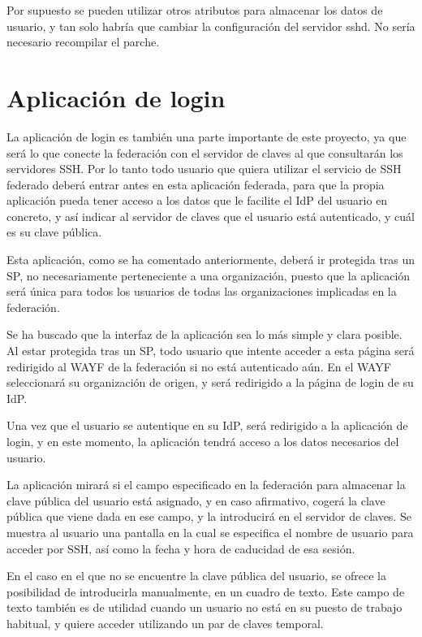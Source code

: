     Por supuesto se pueden utilizar otros atributos para almacenar los
    datos de usuario, y tan solo habría que cambiar la configuración del
    servidor sshd. No sería necesario recompilar el parche.

    \section{Aplicación de login}
    \label{login}
    

    La aplicación de login es también una parte importante de este
    proyecto, ya que será lo que conecte la federación con el servidor de
    claves al que consultarán los servidores SSH. Por lo tanto todo usuario
    que quiera utilizar el servicio de SSH federado deberá entrar antes en
    esta aplicación federada, para que la propia aplicación pueda tener
    acceso a los datos que le facilite el IdP del usuario en concreto, y
    así indicar al servidor de claves que el usuario está autenticado, y
    cuál es su clave pública.

    Esta aplicación, como se ha comentado anteriormente, deberá ir
    protegida tras un SP, no necesariamente perteneciente a una
    organización, puesto que la aplicación será única para todos los
    usuarios de todas las organizaciones implicadas en la federación.

    Se ha buscado que la interfaz de la aplicación sea lo más simple y
    clara posible. Al estar protegida tras un SP, todo usuario que
    intente acceder a esta página será redirigido al WAYF de la federación
    si no está autenticado aún. En el WAYF seleccionará su organización de
    origen, y será redirigido a la página de login de su IdP.

    Una vez que el usuario se autentique en su IdP, será redirigido a la
    aplicación de login, y en este momento, la aplicación tendrá acceso a
    los datos necesarios del usuario.

    La aplicación mirará si el campo especificado en la federación para
    almacenar la clave pública del usuario está asignado, y en caso
    afirmativo, cogerá la clave pública que viene dada en ese campo, y la
    introducirá en el servidor de claves. Se muestra al usuario una
    pantalla en la cual se especifica el nombre de usuario para acceder por
    SSH, así como la fecha y hora de caducidad de esa sesión.

    En el caso en el que no se encuentre la clave pública del usuario, se
    ofrece la posibilidad de introducirla manualmente, en un cuadro de
    texto. Este campo de texto también es de utilidad cuando un usuario no
    está en su puesto de trabajo habitual, y quiere acceder utilizando un
    par de claves temporal.

